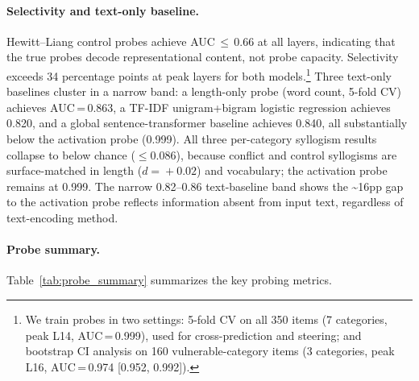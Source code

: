 \documentclass{article}
\begin{document}
\paragraph{Selectivity and text-only baseline.}  Hewitt--Liang control probes achieve
AUC\,$\leq$\,0.66 at all layers, indicating that the true probes
decode representational content, not probe capacity.  Selectivity
exceeds 34 percentage points at peak layers for both models.\footnote{We
  train probes in two settings: 5-fold CV on all 350 items (7 categories,
  peak L14, AUC\,=\,0.999), used for cross-prediction and steering; and
  bootstrap CI analysis on 160 vulnerable-category items (3 categories,
  peak L16, AUC\,=\,0.974 [0.952, 0.992]).}
Three text-only baselines cluster in a narrow band: a
length-only probe (word count, 5-fold CV) achieves AUC\,=\,0.863,
a TF-IDF unigram+bigram logistic regression achieves 0.820, and a
global sentence-transformer baseline achieves 0.840, all substantially
below the activation probe (0.999).  All three per-category syllogism
results collapse to below chance ($\leq$0.086), because
conflict and control syllogisms are surface-matched in length ($d\!=\!+0.02$)
and vocabulary; the activation probe remains at 0.999.  The
narrow 0.82--0.86 text-baseline band shows the \textasciitilde16pp
gap to the activation probe reflects information absent from input
text, regardless of text-encoding method.

\paragraph{Probe summary.}
Table~\ref{tab:probe_summary} summarizes the key probing metrics.
\end{document}
